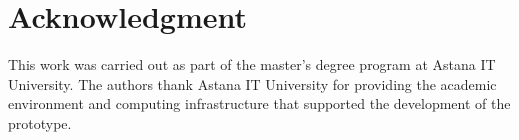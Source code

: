 \documentclass[conference]{IEEEtran}
\begin{document}
\section*{Acknowledgment}

This work was carried out as part of the master’s degree program at Astana IT University. The authors thank Astana IT University for providing the academic environment and computing infrastructure that supported the development of the prototype.

\nocite{Francisco2022}
\nocite{Chrysafiadi2022}
\nocite{pankiewicz2023largelanguagemodelsgpt}
\nocite{AutomatedAssessmentToolsForGrading2022}
\nocite{AdaptiveImmediateFeedbackforBlockBasedProgramming}
\nocite{FeedbackSystemSupportingStudents2022}
\nocite{EvaluationofLLMtoolsforfeedbackgeneration}
\nocite{AutomatingHumanTutorStyleProgrammingFeedback}
\nocite{AITutoringinSDEducation}
\nocite{AutomatedGradingandFeedbackToolsforProgrammingEducationSystematicReview}


\end{document}

